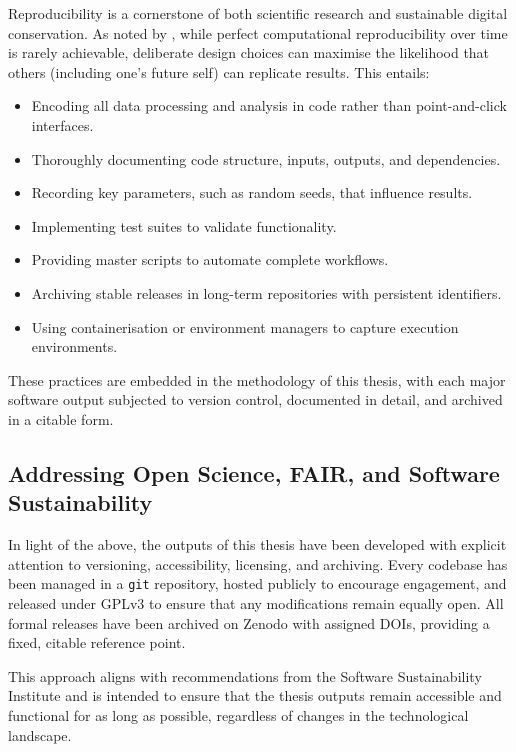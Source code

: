 Reproducibility is a cornerstone of both scientific research and sustainable digital conservation. As noted by \textcite{perkel_challenge_2020}, while perfect computational reproducibility over time is rarely achievable, deliberate design choices can maximise the likelihood that others (including one’s future self) can replicate results. This entails:

\begin{itemize}
    \item Encoding all data processing and analysis in code rather than point-and-click interfaces.
    \item Thoroughly documenting code structure, inputs, outputs, and dependencies.
    \item Recording key parameters, such as random seeds, that influence results.
    \item Implementing test suites to validate functionality.
    \item Providing master scripts to automate complete workflows.
    \item Archiving stable releases in long-term repositories with persistent identifiers.
    \item Using containerisation or environment managers to capture execution environments.
\end{itemize}

These practices are embedded in the methodology of this thesis, with each major software output subjected to version control, documented in detail, and archived in a citable form.

\subsection{Addressing Open Science, FAIR, and Software Sustainability}

In light of the above, the outputs of this thesis have been developed with explicit attention to versioning, accessibility, licensing, and archiving. Every codebase has been managed in a \texttt{git} repository, hosted publicly to encourage engagement, and released under GPLv3 to ensure that any modifications remain equally open. All formal releases have been archived on Zenodo with assigned DOIs, providing a fixed, citable reference point.

This approach aligns with recommendations from the Software Sustainability Institute \cite{hong_how_2019} and is intended to ensure that the thesis outputs remain accessible and functional for as long as possible, regardless of changes in the technological landscape.

